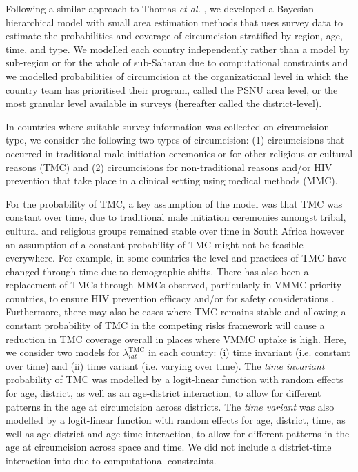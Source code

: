 \documentclass{article}
\begin{document}

Following a similar approach to Thomas {\it et al.} \cite{thomas2021multilevel}, we developed a Bayesian hierarchical model with small area estimation methods that uses survey data to estimate the probabilities and coverage of circumcision stratified by region, age, time, and type. We modelled each country independently rather than a model by sub-region or for the whole of sub-Saharan due to computational constraints and we modelled probabilities of circumcision at the organizational level in which the country team has prioritised their program, called the PSNU area level, or the most granular level available in surveys (hereafter called the district-level). 

In countries where suitable survey information was collected on circumcision type, we consider the following two types of circumcision: (1) circumcisions that occurred in traditional male initiation ceremonies or for other religious or cultural reasons (TMC) and (2) circumcisions for non-traditional reasons and/or HIV prevention that take place in a clinical setting using medical methods (MMC). 

For the probability of TMC, a key assumption of the \cite{thomas2021multilevel} model was that TMC was constant over time, due to traditional male initiation ceremonies amongst tribal, cultural and religious groups remained stable over time in South Africa however an assumption of a constant probability of TMC might not be feasible everywhere. For example, in some countries the level and practices of TMC have changed through time due to demographic shifts. There has also been a replacement of TMCs through MMCs observed, particularly in VMMC priority countries, to ensure HIV prevention efficacy and/or for safety considerations \cite{thomas2021multilevel}. Furthermore, there may also be cases where TMC remains stable and allowing a constant probability of TMC in the competing risks framework will cause a reduction in TMC coverage overall in places where VMMC uptake is high. Here, we consider two models for $\lambda^{\text{TMC}}_{iat}$ in each country: (i) time invariant (i.e. constant over time) and (ii) time variant (i.e. varying over time). The {\it time invariant} probability of TMC was modelled by a logit-linear function with random effects for age, district, as well as an age-district interaction, to allow for different patterns in the age at circumcision across districts. The {\it time variant} was also modelled by a logit-linear function with random effects for age, district, time, as well as age-district and age-time interaction, to allow for different patterns in the age at circumcision across space and time. We did not include a district-time interaction into due to computational constraints. 
\end{document}
